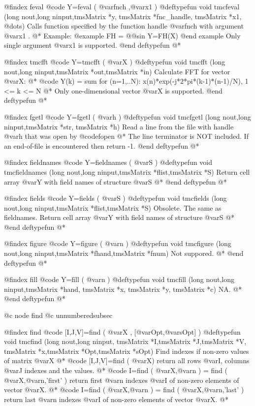 @findex  feval 
@code{  Y=feval (  @var{fnch}  ,@var{x1}  )}
@deftypefun void tmcfeval (long nout,long ninput,tmsMatrix *y, tmsMatrix *fnc_handle, tmsMatrix *x1, @dots{})
 Calls function specified by the function handle @var{fnch} with argument @var{x1} . @*
Example:
@example
FH = @@sin   %
Y=FH(X) %
@end example
Only single argument @var{x1} is supported.
@end deftypefun
@*
 
@findex  tmcfft 
@code{  Y=tmcfft (  @var{X}    )}
@deftypefun void tmcfft (long nout,long ninput,tmsMatrix *out,tmsMatrix *in)
 Calculate FFT for vector @var{X}:  @*
 @code{                            Y(k) =       sum for (n=1,..N): x(n)*exp(-j*2*pi*(k-1)*(n-1)/N), 1 <= k <= N } @*
 Only one-dimensional vector @var{X}  is supported.
@end deftypefun
@*

@findex  fgetl 
@code{  Y=fgetl (  @var{h}    )}
@deftypefun void tmcfgetl (long nout,long ninput,tmsMatrix *str, tmsMatrix *h)
 Read a line from the file with handle  @var{h} that was open by @code{fopen}  @*
The line terminator is NOT  included. If   an end-of-file is encountered then   return -1.
@end deftypefun
@*

@findex  fieldnames 
@code{  Y=fieldnames (  @var{S}    )}
@deftypefun void tmcfieldnames (long nout,long ninput,tmsMatrix *flist,tmsMatrix *S)
Return cell array @var{Y}  with field names of  structure @var{S}  @*
@end deftypefun
@*


@findex  fields 
@code{  Y=fields (  @var{S}    )}
@deftypefun void tmcfields (long nout,long ninput,tmsMatrix *flist,tmsMatrix *S)
Obsolete. The same as fieldnames.
Return cell array @var{Y}  with field names of  structure @var{S}  @*
@end deftypefun
@*

@findex  figure 
@code{  Y=figure (  @var{n}    )}
@deftypefun void tmcfigure (long nout,long ninput,tmsMatrix *fhand,tmsMatrix *fnum)
Not suppored.  @*
@end deftypefun
@*

@findex  fill 
@code{  Y=fill (  @var{n}    )}
@deftypefun void tmcfill (long nout,long ninput,tmsMatrix *hand, tmsMatrix *x, tmsMatrix *y, tmsMatrix *c)
NA.  @*
@end deftypefun
@*


@c node find
@c unnumberedsubsec

@findex  find 
@code{ [I,J,V]=find (  @var{X} , [@var{Opt},@var{sOpt}]   )}
@deftypefun void tmcfind (long nout,long ninput, tmsMatrix *I,tmsMatrix *J,tmsMatrix *V, tmsMatrix *x,tmsMatrix *Opt,tmsMatrix *sOpt)
Find indexes if non-zero values of  matrix @var{X} @*
@code{ [I,J,V]=find (  @var{X}) } return all rows @var{I}, columns @var{J} indexes and the values. @*
@code{ I=find (  @var{X},@var{n} ) = find (  @var{X},@var{n},'first' )  }    return first @var{n} indexes @var{I} of non-zero elements of vector @var{X}. @*
@code{ I=find (  @var{X},@var{n} ) = find (  @var{X},@var{n},'last' )  }    return last @var{n} indexes @var{I} of non-zero elements of vector @var{X}. @*

